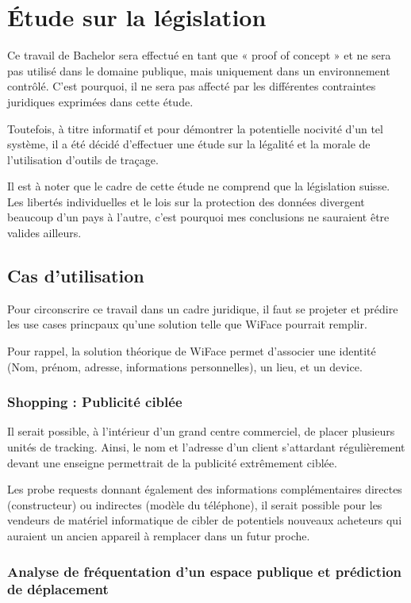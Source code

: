 \chapter{Étude sur la législation}
\label{ch:etudelegislation}

Ce travail de Bachelor sera effectué en tant que « proof of concept » et ne sera pas utilisé dans le domaine publique,
mais uniquement dans un environnement contrôlé. C’est pourquoi, il ne sera pas affecté par les différentes
contraintes juridiques exprimées dans cette étude.

Toutefois, à titre informatif et pour démontrer la potentielle nocivité d’un tel système, il a été décidé d’effectuer
une étude sur la légalité et la morale de l’utilisation d’outils de traçage.

Il est à noter que le cadre de cette étude ne comprend que la législation suisse. Les libertés individuelles et le lois sur la protection des données divergent beaucoup
d'un pays à l'autre, c'est pourquoi mes conclusions ne sauraient être valides ailleurs. 

\section{Cas d’utilisation}
Pour circonscrire ce travail dans un cadre juridique, il faut se projeter et prédire les use cases princpaux qu’une
solution telle que WiFace pourrait remplir.

Pour rappel, la solution théorique de WiFace permet d’associer une identité (Nom, prénom, adresse, informations
personnelles), un lieu, et un device.

\subsection{Shopping : Publicité ciblée}

Il serait possible, à l’intérieur d’un grand centre commerciel, de placer plusieurs unités de tracking. Ainsi, le nom et
l’adresse d’un client s’attardant régulièrement devant une enseigne permettrait de la publicité extrêmement ciblée.

Les probe requests donnant également des informations complémentaires directes (constructeur) ou indirectes
(modèle du téléphone), il serait possible pour les vendeurs de matériel informatique de cibler de potentiels nouveaux
acheteurs qui auraient un ancien appareil à remplacer dans un futur proche.

\subsection{Analyse de fréquentation d’un espace publique et prédiction de déplacement}

